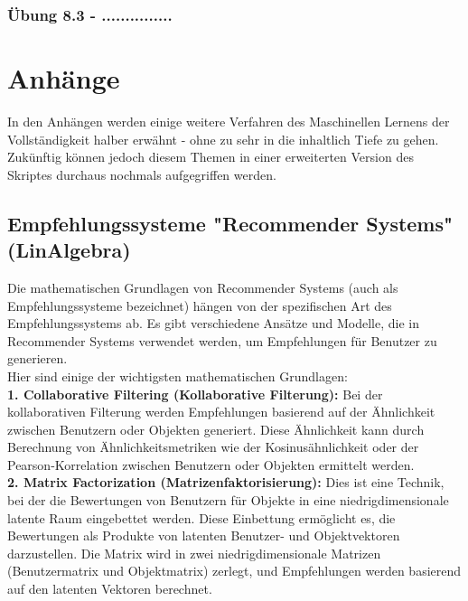 \documentclass[12pt]{article}
\begin{document}
\subsubsection{Übung 8.3 - ...............}

\newpage


\section{Anhänge\\}

In den Anhängen werden einige weitere Verfahren des Maschinellen Lernens der Vollständigkeit halber erwähnt - ohne zu sehr in die inhaltlich Tiefe zu gehen. Zukünftig können jedoch diesem Themen in einer erweiterten Version des Skriptes durchaus nochmals aufgegriffen werden.  \\[0.2cm]


\subsection{Empfehlungssysteme "Recommender Systems" (LinAlgebra)}
Die mathematischen Grundlagen von Recommender Systems (auch als Empfehlungssysteme bezeichnet) hängen von der spezifischen Art des Empfehlungssystems ab. Es gibt verschiedene Ansätze und Modelle, die in Recommender Systems verwendet werden, um Empfehlungen für Benutzer zu generieren.\\
Hier sind einige der wichtigsten mathematischen Grundlagen:\\

\textbf{1. Collaborative Filtering (Kollaborative Filterung):} Bei der kollaborativen Filterung werden Empfehlungen basierend auf der Ähnlichkeit zwischen Benutzern oder Objekten generiert. Diese Ähnlichkeit kann durch Berechnung von Ähnlichkeitsmetriken wie der Kosinusähnlichkeit oder der Pearson-Korrelation zwischen Benutzern oder Objekten ermittelt werden.\\

\textbf{2. Matrix Factorization (Matrizenfaktorisierung):} Dies ist eine Technik, bei der die Bewertungen von Benutzern für Objekte in eine niedrigdimensionale latente Raum eingebettet werden. Diese Einbettung ermöglicht es, die Bewertungen als Produkte von latenten Benutzer- und Objektvektoren darzustellen. Die Matrix wird in zwei niedrigdimensionale Matrizen (Benutzermatrix und Objektmatrix) zerlegt, und Empfehlungen werden basierend auf den latenten Vektoren berechnet.\\
\end{document}
